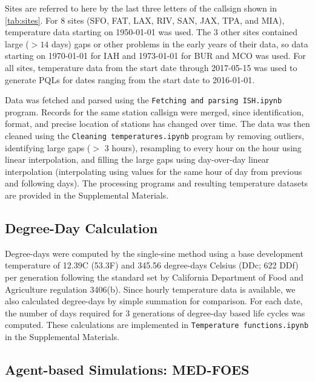 \documentclass[10pt,a4paper,twocolumn]{article}
\begin{document}
Sites are referred to here by the last three letters of the callsign shown in 
\autoref{tab:sites}.
For 8 sites (SFO, FAT, LAX, RIV, SAN, JAX, TPA, and MIA), temperature data starting on 1950-01-01 was used.
The 3 other sites contained large (${>}14$ days) gaps or other problems in the early years of their data,
so data starting on 1970-01-01 for IAH and 1973-01-01 for BUR and MCO was used.
For all sites, temperature data from the start date through 2017-05-15 was used
to generate PQLs for dates ranging from the start date to 2016-01-01.

Data was fetched and parsed using the \texttt{Fetching and parsing ISH.ipynb} program.
Records for the same station callsign were merged, since identification, format, 
and precise location of stations has changed over time.
The data was then cleaned using the 
\texttt{Cleaning temperatures.ipynb} program by 
removing outliers, 
identifying large gaps ($>$ 3 hours), 
resampling to every hour on the hour using linear interpolation,
and filling the large gaps using day-over-day linear interpolation
(interpolating using values for the same hour of day from previous and following days).
The processing programs and resulting temperature datasets are 
provided in the Supplemental Materials.


\subsection*{Degree-Day Calculation}
Degree-days were computed by the single-sine method\cite{ECY:ECY1969503514}
using a base development temperature of 12.39\degree C (53.3\degree F) 
and 345.56 degree-days Celsius (DDc; 622 DDf) per generation 
following the standard set by California Department of Food and Agriculture
regulation 3406(b)\cite{CDFA_Medfly,3-CA-ADC-3406}.
Since hourly temperature data is available, 
we also calculated degree-days by simple summation
for comparison\cite{Roltsch1999}.
For each date, the number of days required for 3 generations of degree-day 
based life cycles was computed.
These calculations are implemented in \texttt{Temperature functions.ipynb} in the Supplemental Materials.


\subsection*{Agent-based Simulations: MED-FOES}
\end{document}
